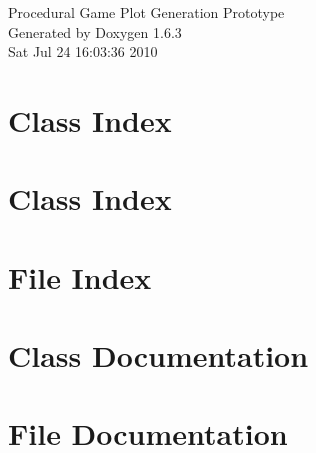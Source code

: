 \documentclass[a4paper]{book}
\begin{document}
\hypersetup{pageanchor=false}
\begin{titlepage}
\vspace*{7cm}
\begin{center}
{\Large Procedural Game Plot Generation Prototype }\\
\vspace*{1cm}
{\large Generated by Doxygen 1.6.3}\\
\vspace*{0.5cm}
{\small Sat Jul 24 16:03:36 2010}\\
\end{center}
\end{titlepage}
\clearemptydoublepage
{}
\tableofcontents
\clearemptydoublepage
{}
\hypersetup{pageanchor=true}
\chapter{Class Index}

\chapter{Class Index}

\chapter{File Index}

\chapter{Class Documentation}




























\chapter{File Documentation}






























\printindex
\end{document}
